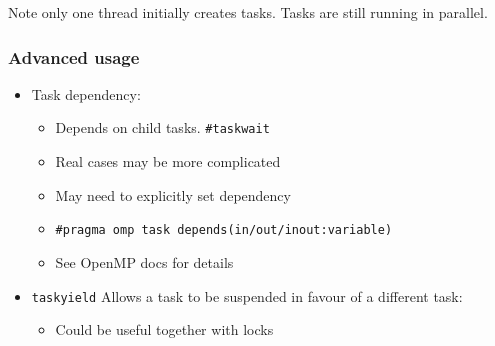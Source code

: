 \begin{Shaded}
\begin{Highlighting}[]

   
\NormalTok{\{}
    \NormalTok{);}
      \NormalTok{;}
     
    \NormalTok{\{}
        \NormalTok{\{}
       \NormalTok{\}}
    \NormalTok{\}}
      
\NormalTok{\}}
\end{Highlighting}
\end{Shaded}

Note only one thread initially creates tasks. Tasks are still running in
parallel.

\subsubsection{Advanced usage}\label{advanced-usage}

\begin{itemize}
\itemsep1pt\parskip0pt
\item
  Task dependency:

  \begin{itemize}
  \itemsep1pt\parskip0pt
  \item
    Depends on child tasks. \texttt{\#taskwait}
  \item
    Real cases may be more complicated
  \item
    May need to explicitly set dependency
  \item
    \texttt{\#pragma omp task depends(in/out/inout:variable)}
  \item
    See OpenMP docs for details
  \end{itemize}
\item
  \texttt{taskyield} Allows a task to be suspended in favour of a
  different task:

  \begin{itemize}
  \itemsep1pt\parskip0pt
  \item
    Could be useful together with locks
  \end{itemize}
\end{itemize}


